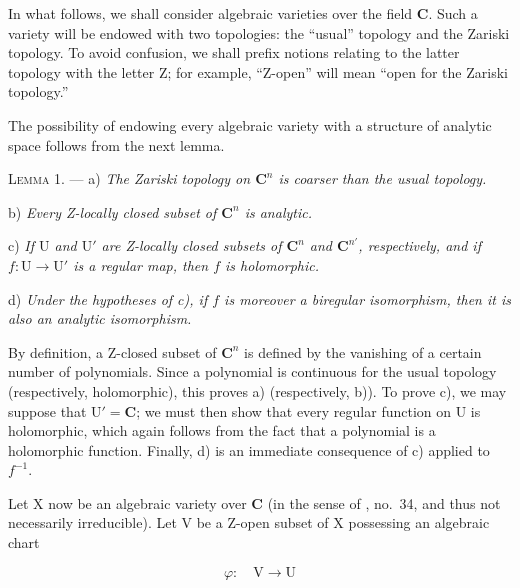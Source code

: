 
In what follows, we shall consider algebraic varieties over the field $\mathbf{C}$. Such a variety will be endowed with two topologies: the ``usual'' topology and the Zariski topology. To avoid confusion, we shall prefix notions relating to the latter topology with the letter Z; for example, ``Z-open'' will mean ``open for the Zariski topology.''


The possibility of endowing every algebraic variety with a structure of analytic space follows from the next lemma.

\textsc{Lemma 1}. --- a) \emph{The Zariski topology on $\mathbf{C}^n$ is coarser than the usual topology.}

b) \emph{Every Z-locally closed subset of $\mathbf{C}^n$ is analytic.}

c) \emph{If $\mathrm{U}$ and $\mathrm{U}'$ are Z-locally closed subsets of $\mathbf{C}^n$ and $\mathbf{C}^{n'}$, respectively, and if $f:\mathrm{U}\to\mathrm{U}'$ is a regular map, then $f$ is holomorphic.}

d) \emph{Under the hypotheses of c), if $f$ is moreover a biregular isomorphism, then it is also an analytic isomorphism.}

By definition, a Z-closed subset of $\mathbf{C}^n$ is defined by the vanishing of a certain number of polynomials. Since a polynomial is continuous for the usual topology (respectively, holomorphic), this proves a) (respectively, b)). To prove c), we may suppose that $\mathrm{U}'=\mathbf{C}$; we must then show that every regular function on $\mathrm{U}$ is holomorphic, which again follows from the fact that a polynomial is a holomorphic function. Finally, d) is an immediate consequence of c) applied to $f^{-1}$.

Let $\mathrm{X}$ now be an algebraic variety over $\mathbf{C}$ (in the sense of , no.~34, and thus not necessarily irreducible). Let $\mathrm{V}$ be a Z-open subset of $\mathrm{X}$ possessing an algebraic chart

\begin{equation*}
\varphi:\quad \mathrm{V}\longrightarrow\mathrm{U}
\end{equation*}

